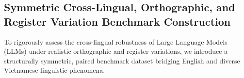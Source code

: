 
\subsection{Symmetric Cross-Lingual, Orthographic, and Register Variation Benchmark Construction}
\label{sec:dataset_construction}

To rigorously assess the cross-lingual robustness of Large Language Models (LLMs) under realistic orthographic and register variations, we introduce a structurally symmetric, paired benchmark dataset bridging English and diverse Vietnamese linguistic phenomena.

